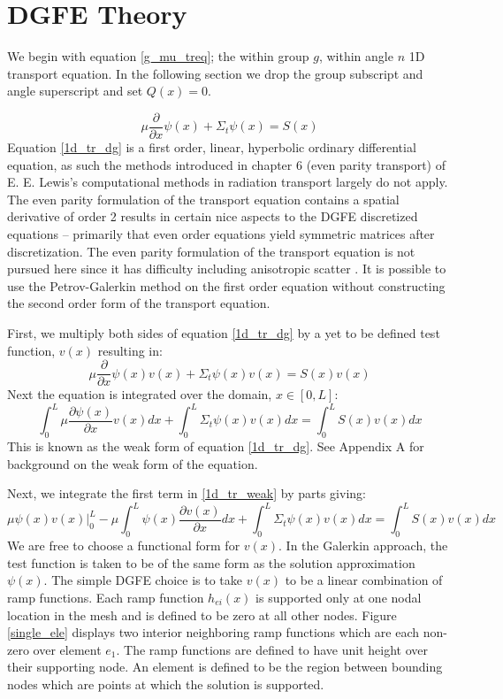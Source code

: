 \section{DGFE Theory}

We begin with equation \ref{g_mu_treq}; the within group $g$, within angle $n$ 1D transport equation.  In the following section we drop the group subscript and angle superscript and set $Q(x)=0$.

\begin{equation}
\mu \frac{\partial}{\partial x} \psi(x) + \Sigma_t \psi(x) = S(x)
\label{1d_tr_dg}
\end{equation}
Equation \ref{1d_tr_dg} is a first order, linear, hyperbolic ordinary differential equation, as such the methods introduced in chapter 6
(even parity transport) of E. E. Lewis’s computational methods in radiation transport largely do not apply. The even parity formulation of the transport equation contains a spatial derivative of order 2 results
in certain nice aspects to the DGFE discretized equations – primarily that even order equations yield
symmetric matrices after discretization. The even parity formulation of the transport equation is not pursued here
since it has difficulty including anisotropic scatter \cite{Lewis}. It is possible to use the Petrov-Galerkin method
on the first order equation without constructing the second order form of the transport equation.

First, we multiply both sides of equation \ref{1d_tr_dg} by a yet to be defined test function, $v(x)$ resulting in:
\begin{equation}
\mu \frac{\partial}{\partial x} \psi(x) v(x) + \Sigma_t \psi(x)v(x) = S(x)v(x)
\label{1d_tr_dg2}
\end{equation}
Next the equation is integrated over the domain, $x \in [0, L]$:
\begin{equation}
\int_0^L \mu \frac{\partial \psi(x)}{\partial x} v(x) dx + \int_0^L \Sigma_t \psi(x)v(x) dx =  \int_0^L S(x)v(x) dx
\label{1d_tr_weak}
\end{equation}
This is known as the weak form of equation \ref{1d_tr_dg}.
See Appendix A for background on the weak form of the equation.

Next, we integrate the first term in \ref{1d_tr_weak} by parts giving:
\begin{equation}
\mu \psi(x)v(x)|_0^L- \mu \int_0^L  \psi(x) \frac{\partial v(x)}{\partial x} dx + \int_0^L \Sigma_t \psi(x)v(x) dx =  \int_0^L S(x)v(x) dx
\label{1d_tr_weak2}
\end{equation}
We are free to choose a functional form for $v(x)$. In the Galerkin approach, the test function is
taken to be of the same form as the solution approximation $\psi(x)$. The simple DGFE choice is to take $v(x)$ to be a
linear combination of ramp functions. Each ramp function $h_{ei}(x)$ is supported only at one nodal location in the mesh
and is defined to be zero at all other nodes. Figure \ref{single_ele} displays two interior neighboring ramp functions which are each non-zero over element $e_1$. The ramp functions are defined to have unit height over their supporting node.  An element is defined to be the region between bounding nodes which are points at which the solution is supported.

